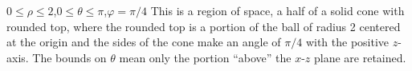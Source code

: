 {$0\leq \rho\leq 2$,\quad $0\leq \theta\leq \pi$,\quad $\varphi = \pi/4$
}
{This is a region of space, a half of a solid cone with rounded top, where the rounded top is a portion of the ball of radius 2 centered at the origin and the sides of the cone make an angle of $\pi/4$ with the positive $z$-axis. The bounds on $\theta$ mean only the portion ``above'' the $x$-$z$ plane are retained.
}
